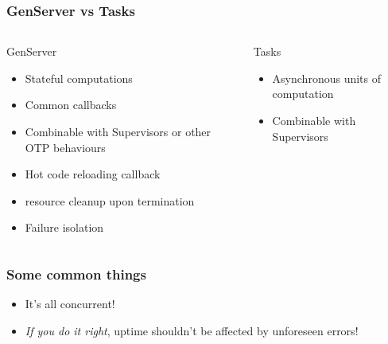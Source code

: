 \begin{frame}
    \frametitle{GenServer vs Tasks}
    \begin{columns}
        \begin{column}[T]{0.5\textwidth}
            GenServer
            \vfill
            \begin{itemize}
                \small
                \item Stateful computations
                \item Common callbacks
                \item Combinable with Supervisors or other OTP behaviours
                \item Hot code reloading callback
                \item resource cleanup upon termination
                \item Failure isolation
            \end{itemize}
        \end{column}
        \begin{column}[T]{0.5\textwidth}
            Tasks
            \begin{itemize}
                \small
                \item Asynchronous units of computation
                \item Combinable with Supervisors
            \end{itemize}
        \end{column}
    \end{columns}
\end{frame}

\begin{frame}
    \frametitle{Some common things}
    \begin{itemize}
        \item It's all concurrent!
        \item \textit{If you do it right}, uptime shouldn't be affected by unforeseen errors!
    \end{itemize}
\end{frame}